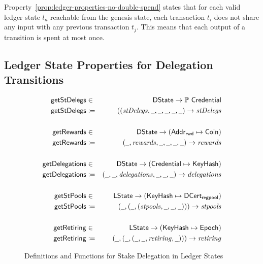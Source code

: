 Property~\ref{prop:ledger-properties-no-double-spend} states that for each valid
ledger state $l_{n}$ reachable from the genesis state, each transaction $t_{i}$
does not share any input with any previous transaction $t_{j}$. This means that
each output of a transition is spent at most once.

\subsection{Ledger State Properties for Delegation Transitions}
\label{sec:ledg-prop-deleg}

\begin{figure}[ht]
  \centering
  \begin{align*}
    \fun{getStDelegs} & \in & \DState \to \powerset \Credential \\
    \fun{getStDelegs} & \coloneqq &
                                    ((\var{stDelegs}, \wcard,
                                    \wcard,\wcard,\wcard,\wcard) \to \var{stDelegs} \\
                      &&\\
    \fun{getRewards} & \in & \DState \to (\AddrRWD \mapsto \Coin) \\
    \fun{getRewards} & \coloneqq & (\wcard, \var{rewards},
                                   \wcard,\wcard,\wcard,\wcard)
                                   \to \var{rewards} \\
                      &&\\
    \fun{getDelegations} & \in & \DState \to (\Credential \mapsto \KeyHash) \\
    \fun{getDelegations} & \coloneqq & (\wcard, \wcard,
                                       \var{delegations},\wcard,\wcard,\wcard) \to
                                       \var{delegations} \\
                      &&\\
    \fun{getStPools} & \in & \LState \to (\KeyHash \mapsto \DCertRegPool) \\
    \fun{getStPools} & \coloneqq & (\wcard, (\wcard,
                                   (\var{stpools},\wcard,\wcard,\wcard))) \to \var{stpools} \\
                      &&\\
    \fun{getRetiring} & \in & \LState \to (\KeyHash \mapsto \Epoch) \\
    \fun{getRetiring} & \coloneqq & (\wcard, (\wcard,
                                    (\wcard, \wcard, \var{retiring},\wcard))) \to \var{retiring} \\
  \end{align*}
  \caption{Definitions and Functions for Stake Delegation in Ledger States}
  \label{fig:stake-delegation-functions}
\end{figure}


